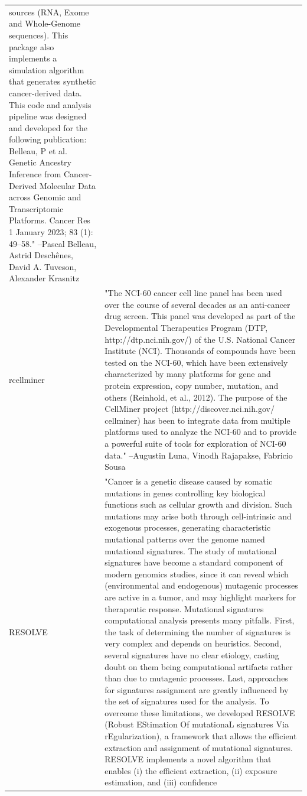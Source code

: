 \documentclass[]{article}
\begin{document}
\begin{longtable}[t]{l>{\raggedright\arraybackslash}p{25em}}
sources (RNA, Exome and Whole-Genome sequences). This package
also implements a simulation algorithm that generates synthetic
cancer-derived data. This code and analysis pipeline was
designed and developed for the following publication: Belleau,
P et al. Genetic Ancestry Inference from Cancer-Derived
Molecular Data across Genomic and Transcriptomic Platforms.
Cancer Res 1 January 2023; 83 (1): 49–58." --Pascal Belleau, Astrid Deschênes, David A. Tuveson, Alexander Krasnitz\\
rcellminer & "The NCI-60 cancer cell line panel has been used over the
course of several decades as an anti-cancer drug screen. This
panel was developed as part of the Developmental Therapeutics
Program (DTP, http://dtp.nci.nih.gov/) of the U.S. National
Cancer Institute (NCI). Thousands of compounds have been tested
on the NCI-60, which have been extensively characterized by
many platforms for gene and protein expression, copy number,
mutation, and others (Reinhold, et al., 2012). The purpose of
the CellMiner project (http://discover.nci.nih.gov/ cellminer)
has been to integrate data from multiple platforms used to
analyze the NCI-60 and to provide a powerful suite of tools for
exploration of NCI-60 data." --Augustin Luna, Vinodh Rajapakse, Fabricio Sousa\\
RESOLVE & "Cancer is a genetic disease caused by somatic mutations in
genes controlling key biological functions such as cellular
growth and division. Such mutations may arise both through
cell-intrinsic and exogenous processes, generating
characteristic mutational patterns over the genome named
mutational signatures. The study of mutational signatures have
become a standard component of modern genomics studies, since
it can reveal which (environmental and endogenous) mutagenic
processes are active in a tumor, and may highlight markers for
therapeutic response. Mutational signatures computational
analysis presents many pitfalls. First, the task of determining
the number of signatures is very complex and depends on
heuristics. Second, several signatures have no clear etiology,
casting doubt on them being computational artifacts rather than
due to mutagenic processes. Last, approaches for signatures
assignment are greatly influenced by the set of signatures used
for the analysis. To overcome these limitations, we developed
RESOLVE (Robust EStimation Of mutationaL signatures Via
rEgularization), a framework that allows the efficient
extraction and assignment of mutational signatures. RESOLVE
implements a novel algorithm that enables (i) the efficient
extraction, (ii) exposure estimation, and (iii) confidence

\end{longtable}
\end{document}
